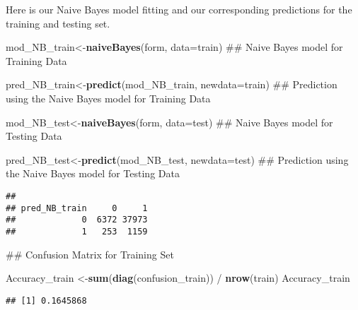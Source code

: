 \documentclass[11pt,letterpaper,]{article}
\newenvironment{Shaded}{\begin{snugshade}}{\end{snugshade}}
\newcommand{\KeywordTok}[1]{\textcolor[rgb]{0.13,0.29,0.53}{\textbf{{#1}}}}
\newcommand{\DataTypeTok}[1]{\textcolor[rgb]{0.13,0.29,0.53}{{#1}}}
\newcommand{\StringTok}[1]{\textcolor[rgb]{0.31,0.60,0.02}{{#1}}}
\newcommand{\NormalTok}[1]{{#1}}
\theoremstyle{definition}
\theoremstyle{definition}
\theoremstyle{definition}
\theoremstyle{remark}
\begin{document}
Here is our Naive Bayes model fitting and our corresponding predictions
for the training and testing set.

\begin{Shaded}
\begin{Highlighting}[]
\NormalTok{mod_NB_train<-}\KeywordTok{naiveBayes}\NormalTok{(form, }\DataTypeTok{data=}\NormalTok{train)}
\NormalTok{## Naive Bayes model for Training Data}

\NormalTok{pred_NB_train<-}\KeywordTok{predict}\NormalTok{(mod_NB_train, }\DataTypeTok{newdata=}\NormalTok{train)}
\NormalTok{## Prediction using the Naive Bayes model for Training Data}

\NormalTok{mod_NB_test<-}\KeywordTok{naiveBayes}\NormalTok{(form, }\DataTypeTok{data=}\NormalTok{test)}
\NormalTok{## Naive Bayes model for Testing Data}

\NormalTok{pred_NB_test<-}\KeywordTok{predict}\NormalTok{(mod_NB_test, }\DataTypeTok{newdata=}\NormalTok{test)}
\NormalTok{## Prediction using the Naive Bayes model for Testing Data}
\end{Highlighting}
\end{Shaded}

\begin{Shaded}
\end{Shaded}

\begin{verbatim}
##              
## pred_NB_train     0     1
##             0  6372 37973
##             1   253  1159
\end{verbatim}

\begin{Shaded}
\begin{Highlighting}[]
\NormalTok{## Confusion Matrix for Training Set}

\NormalTok{Accuracy_train <-}\KeywordTok{sum}\NormalTok{(}\KeywordTok{diag}\NormalTok{(confusion_train))   /}\StringTok{ }\KeywordTok{nrow}\NormalTok{(train)}
\NormalTok{Accuracy_train}
\end{Highlighting}
\end{Shaded}

\begin{verbatim}
## [1] 0.1645868
\end{verbatim}

\begin{Shaded}
\end{Shaded}
\end{document}
